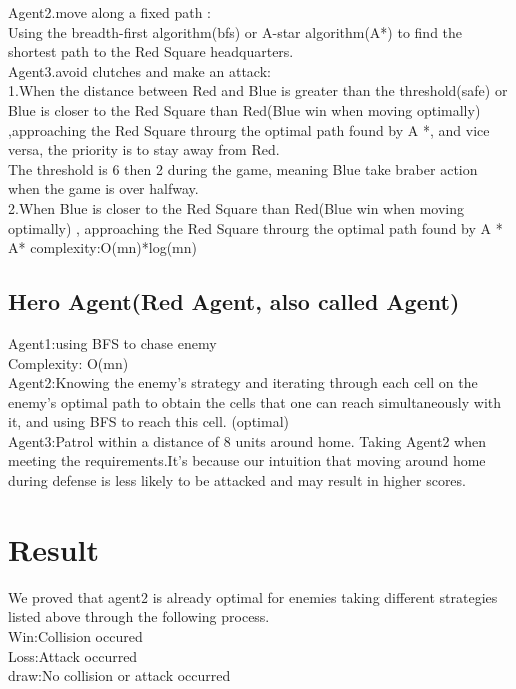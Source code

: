 \documentclass{article}
\begin{document}
Agent2.move along a fixed path :\\
 Using the breadth-first algorithm(bfs) or A-star algorithm(A*) to find the shortest path to the Red Square headquarters.\\
 
Agent3.avoid clutches and make an attack:\\
1.When the distance between Red and Blue is greater than the threshold(safe) or Blue is closer to the Red Square than Red(Blue win when moving optimally) ,approaching the Red Square throurg the optimal path found by A *, and vice versa, the priority is to stay away from Red.\\
The threshold is 6 then 2 during the game, meaning Blue take braber action when the game is over halfway.\\
2.When Blue is closer to the Red Square than Red(Blue win when moving optimally) , approaching the Red Square throurg the optimal path found by A *\\
A* complexity:O(mn)*log(mn)\\



\subsection{Hero Agent(Red Agent, also called Agent)}
Agent1:using BFS to chase enemy\\
Complexity: O(mn)\\

Agent2:Knowing the enemy's strategy and iterating through each cell on the enemy's optimal path to obtain the cells that one can reach simultaneously with it, and using BFS to reach this cell. (optimal)\\

Agent3:Patrol within a distance of 8 units around home. Taking Agent2 when meeting the requirements.It's because our intuition that moving around home during defense is less likely to be attacked and may result in higher scores.\\

\section{Result}
\label{others}
We proved that agent2 is already optimal for enemies taking different strategies listed above through the following process.\\

Win:Collision occured\\
Loss:Attack occurred\\
draw:No collision or attack occurred\\
\end{document}
